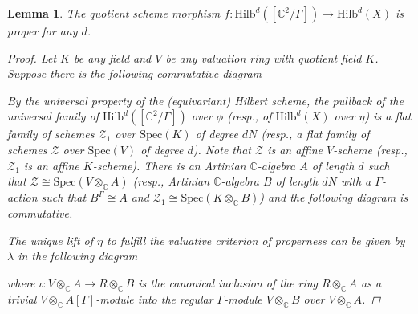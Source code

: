 \documentclass{amsart}[12pt]
\newtheorem{lemma}[theorem]{Lemma}
\theoremstyle{definition}
\theoremstyle{remark}
\numberwithin{equation}{section}
\begin{document}
\begin{lemma}\label{proper}
The quotient scheme morphism $f: \mathrm{Hilb}^{d}([\mathbb{C}^2/\Gamma]) \to \mathrm{Hilb}^d(X)$ is proper for any $d$.
\begin{proof}
Let $K$ be any field and $V$ be any valuation ring with quotient field $K$. Suppose there is the following commutative diagram
\begin{center}
\end{center}
By the universal property of the (equivariant) Hilbert scheme, the pullback of the universal family of $\mathrm{Hilb}^d([\mathbb{C}^2/\Gamma])$ over $\phi$ (resp., of $\mathrm{Hilb}^d(X)$ over $\eta$) is a flat family of schemes $\mathcal{Z}_1$ over $\mathrm{Spec} (K)$ of degree $dN$ (resp., a flat family of schemes $\mathcal{Z}$ over $\mathrm{Spec} (V)$ of degree $d$). Note that $\mathcal{Z}$ is an affine $V$-scheme (resp., $\mathcal{Z}_1$ is an affine $K$-scheme). There is an Artinian $\mathbb{C}$-algebra $A$ of length $d$ such that $\mathcal{Z} \cong \mathrm{Spec}(V \otimes_{\mathbb{C}}A)$ (resp., Artinian $\mathbb{C}$-algebra $B$ of length $dN$ with a $\Gamma$-action such that $B^{\Gamma} \cong A$ and $\mathcal{Z}_1 \cong \mathrm{Spec}(K \otimes_{\mathbb{C}}B)$) and the following diagram is commutative.
\begin{center}
\end{center}
The unique lift of $\eta$ to fulfill the valuative criterion of properness can be given by $\lambda$ in the following diagram
\begin{center}
\end{center}
where $\iota: V \otimes_{\mathbb{C}}A \to R \otimes_{\mathbb{C}}B$ is the canonical inclusion of the ring $R \otimes_{\mathbb{C}}A$ as a trivial $V \otimes_{\mathbb{C}}A[\Gamma]$-module into the regular $\Gamma$-module $V \otimes_{\mathbb{C}}B$ over $V \otimes_{\mathbb{C}}A$.
\end{proof}
\end{lemma}
\end{document}
